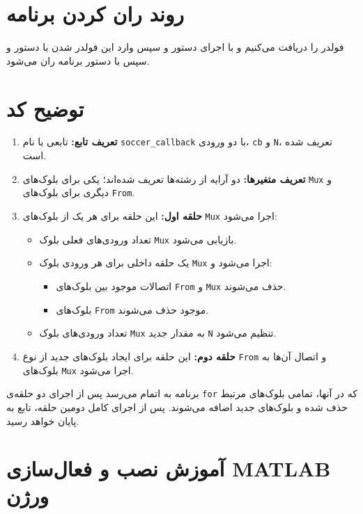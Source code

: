 \newpage

\section*{روند ران کردن برنامه}

فولدر
را دریافت می‌کنیم و با اجرای دستور
و سپس وارد این فولدر شدن با دستور
و سپس با دستور
برنامه ران می‌شود.

\section*{توضیح کد}

\begin{enumerate}
	\item \textbf{تعریف تابع:} تابعی با نام \texttt{soccer\_callback} با دو ورودی، \texttt{cb} و \texttt{N}، تعریف شده است.
	\item \textbf{تعریف متغیر‌ها:} دو آرایه از رشته‌ها تعریف شده‌اند؛ یکی برای بلوک‌های \texttt{Mux} و دیگری برای بلوک‌های \texttt{From}.
	\item \textbf{حلقه اول:} این حلقه برای هر یک از بلوک‌های \texttt{Mux} اجرا می‌شود:
	\begin{itemize}
		\item تعداد ورودی‌های فعلی بلوک \texttt{Mux} بازیابی می‌شود.
		\item یک حلقه داخلی برای هر ورودی بلوک \texttt{Mux} اجرا می‌شود و:
		\begin{itemize}
			\item اتصالات موجود بین بلوک‌های \texttt{From} و \texttt{Mux} حذف می‌شوند.
			\item بلوک‌های \texttt{From} موجود حذف می‌شوند.
		\end{itemize}
		\item تعداد ورودی‌های بلوک \texttt{Mux} به مقدار جدید \texttt{N} تنظیم می‌شود.
	\end{itemize}
	\item \textbf{حلقه دوم:} این حلقه برای ایجاد بلوک‌های جدید از نوع \texttt{From} و اتصال آن‌ها به بلوک‌های \texttt{Mux} اجرا می‌شود.
\end{enumerate}

برنامه به اتمام می‌رسد پس از اجرای دو حلقه‌ی \texttt{for} که در آنها، تمامی بلوک‌های مرتبط حذف شده و بلوک‌های جدید اضافه می‌شوند. پس از اجرای کامل دومین حلقه، تابع به پایان خواهد رسید.


\newpage

\section*{آموزش نصب و فعال‌سازی MATLAB ورژن }

